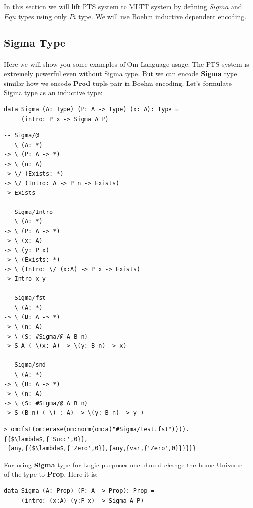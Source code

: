 \documentclass[11pt,oneside]{article}
\begin{document}
In this section we will lift PTS system to MLTT system by defining
$Sigma$ and $Equ$ types using only $Pi$ type. We will use Boehm inductive
dependent encoding.

\subsection{Sigma Type}

\paragraph{}
Here we will show you some examples of Om Language usage.
The PTS system is extremely powerful even without Sigma type. But
we can encode {\bf Sigma} type similar how we encode {\bf Prod}
tuple pair in Boehm encoding. Let's formulate Sigma type as an inductive type:

\begin{lstlisting}[mathescape=true]
data Sigma (A: Type) (P: A -> Type) (x: A): Type =
     (intro: P x -> Sigma A P)
\end{lstlisting}

\begin{lstlisting}[mathescape=true]
-- Sigma/@
   \ (A: *)
-> \ (P: A -> *)
-> \ (n: A)
-> \/ (Exists: *)
-> \/ (Intro: A -> P n -> Exists)
-> Exists

-- Sigma/Intro
   \ (A: *)
-> \ (P: A -> *)
-> \ (x: A)
-> \ (y: P x)
-> \ (Exists: *)
-> \ (Intro: \/ (x:A) -> P x -> Exists)
-> Intro x y

-- Sigma/fst
   \ (A: *)
-> \ (B: A -> *)
-> \ (n: A)
-> \ (S: #Sigma/@ A B n)
-> S A ( \(x: A) -> \(y: B n) -> x)

-- Sigma/snd
   \ (A: *)
-> \ (B: A -> *)
-> \ (n: A)
-> \ (S: #Sigma/@ A B n)
-> S (B n) ( \(_: A) -> \(y: B n) -> y )
\end{lstlisting}

\begin{lstlisting}[mathescape=true]
> om:fst(om:erase(om:norm(om:a("#Sigma/test.fst")))).
{{$\lambda$,{'Succ',0}},
 {any,{{$\lambda$,{'Zero',0}},{any,{var,{'Zero',0}}}}}}
\end{lstlisting}

For using {\bf Sigma} type for Logic purposes one should change the
home Universe of the type to {\bf Prop}. Here it is:

\begin{lstlisting}[mathescape=true]
data Sigma (A: Prop) (P: A -> Prop): Prop =
     (intro: (x:A) (y:P x) -> Sigma A P)
\end{lstlisting}
\end{document}
